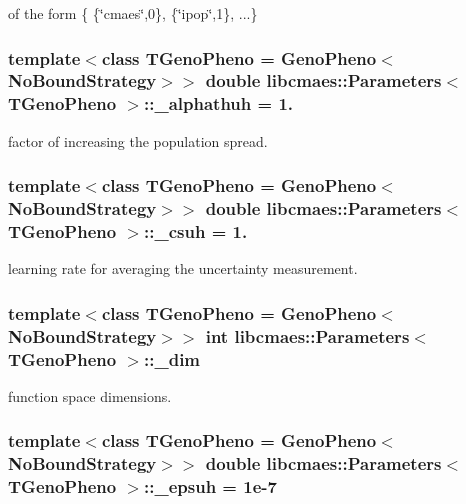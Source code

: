 of the form \{ \{\char`\"{}cmaes\char`\"{},0\}, \{\char`\"{}ipop\char`\"{},1\}, ...\} \hypertarget{classlibcmaes_1_1Parameters_afe9928f77d0413fb75a24fe0cb0f947b}{
\subsubsection[{\+\_\+alphathuh}]{\setlength{\rightskip}{0pt plus 5cm}template$<$class T\+Geno\+Pheno = Geno\+Pheno$<$\+No\+Bound\+Strategy$>$$>$ double {\bf libcmaes\+::\+Parameters}$<$ T\+Geno\+Pheno $>$\+::\+\_\+alphathuh = 1.\hspace{0.3cm}{\ttfamily [protected]}}}\label{classlibcmaes_1_1Parameters_afe9928f77d0413fb75a24fe0cb0f947b}
factor of increasing the population spread. \hypertarget{classlibcmaes_1_1Parameters_acedc12aaa2bcb0923279a15fc2fd4295}{
\subsubsection[{\+\_\+csuh}]{\setlength{\rightskip}{0pt plus 5cm}template$<$class T\+Geno\+Pheno = Geno\+Pheno$<$\+No\+Bound\+Strategy$>$$>$ double {\bf libcmaes\+::\+Parameters}$<$ T\+Geno\+Pheno $>$\+::\+\_\+csuh = 1.\hspace{0.3cm}{\ttfamily [protected]}}}\label{classlibcmaes_1_1Parameters_acedc12aaa2bcb0923279a15fc2fd4295}
learning rate for averaging the uncertainty measurement. \hypertarget{classlibcmaes_1_1Parameters_affc62ae5c5f1db4f88e4c2dc96387af6}{
\subsubsection[{\+\_\+dim}]{\setlength{\rightskip}{0pt plus 5cm}template$<$class T\+Geno\+Pheno = Geno\+Pheno$<$\+No\+Bound\+Strategy$>$$>$ int {\bf libcmaes\+::\+Parameters}$<$ T\+Geno\+Pheno $>$\+::\+\_\+dim\hspace{0.3cm}{\ttfamily [protected]}}}\label{classlibcmaes_1_1Parameters_affc62ae5c5f1db4f88e4c2dc96387af6}
function space dimensions. \hypertarget{classlibcmaes_1_1Parameters_ab79e42306610b24fafe017a011373bd8}{
\subsubsection[{\+\_\+epsuh}]{\setlength{\rightskip}{0pt plus 5cm}template$<$class T\+Geno\+Pheno = Geno\+Pheno$<$\+No\+Bound\+Strategy$>$$>$ double {\bf libcmaes\+::\+Parameters}$<$ T\+Geno\+Pheno $>$\+::\+\_\+epsuh = 1e-\/7\hspace{0.3cm}{\ttfamily [protected]}}}\label{classlibcmaes_1_1Parameters_ab79e42306610b24fafe017a011373bd8}
